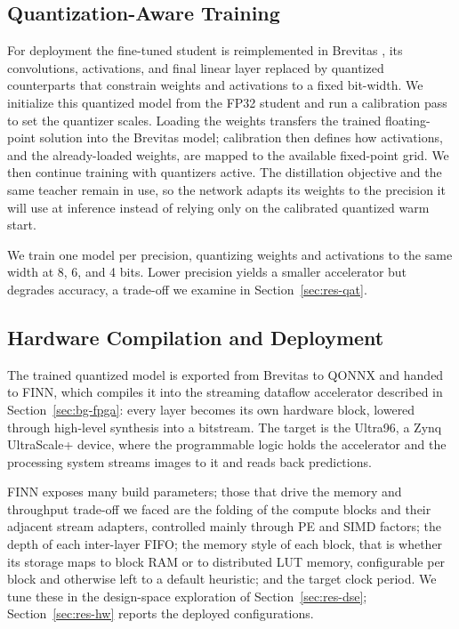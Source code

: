 \subsection{Quantization-Aware Training}
\label{sec:method-qat}

For deployment the fine-tuned student is reimplemented in Brevitas
\cite{pappalardo2023brevitas}, its convolutions, activations, and final linear
layer replaced by quantized counterparts that constrain weights and activations to
a fixed bit-width. We initialize this quantized model from the FP32 student and
run a calibration pass to set the quantizer scales. Loading the weights transfers
the trained floating-point solution into the Brevitas model; calibration then
defines how activations, and the already-loaded weights, are mapped to the
available fixed-point grid. We then continue training with quantizers active. The
distillation objective and the same teacher remain in use, so the network adapts
its weights to the precision it will use at inference instead of relying only on
the calibrated quantized warm start.

We train one model per precision, quantizing weights and activations to the same
width at 8, 6, and 4 bits. Lower precision yields a smaller accelerator but
degrades accuracy, a trade-off we examine in Section~\ref{sec:res-qat}.

\subsection{Hardware Compilation and Deployment}
\label{sec:method-hw}

The trained quantized model is exported from Brevitas to QONNX and handed to FINN,
which compiles it into the streaming dataflow accelerator described in
Section~\ref{sec:bg-fpga}: every layer becomes its own hardware block, lowered
through high-level synthesis into a bitstream. The target is the Ultra96, a Zynq
UltraScale+ device, where the programmable logic holds the accelerator and the
processing system streams images to it and reads back predictions.

FINN exposes many build parameters; those that drive the memory and throughput
trade-off we faced are the folding of the compute blocks and their adjacent stream
adapters, controlled mainly through PE and SIMD factors; the depth of each
inter-layer FIFO; the memory style of each block, that is whether its storage
maps to block RAM or to distributed LUT memory, configurable per block and
otherwise left to a default heuristic; and the target clock period. We tune these
in the design-space exploration of Section~\ref{sec:res-dse};
Section~\ref{sec:res-hw} reports the deployed configurations.

